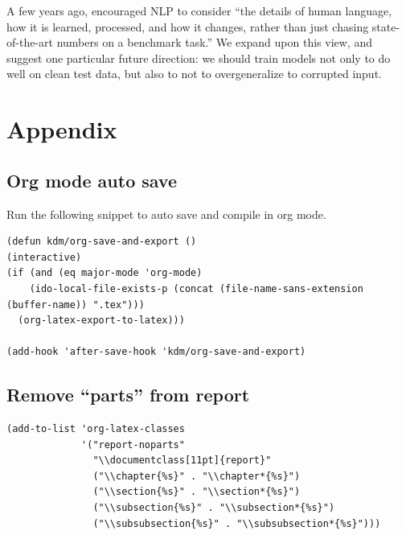 \documentclass[letterpaper, 12pt]{report}
\begin{document}
A few years ago, \cite{manning-etal-2015-computational} encouraged NLP to consider ``the details of human language, how it is learned, processed, and how it changes, rather than just chasing state-of-the-art numbers on a benchmark task.'' We expand upon this view, and suggest one particular future direction: we should train models not only to do well on clean test data, but also to not to overgeneralize to corrupted input. %



\clearpage





\printglossaries

\chapter{Appendix}
\label{sec:orgd5099eb}
\section{Org mode auto save}
\label{sec:orgde5798f}
Run the following snippet to auto save and compile in org mode.

\begin{verbatim}
(defun kdm/org-save-and-export ()
(interactive)
(if (and (eq major-mode 'org-mode)
    (ido-local-file-exists-p (concat (file-name-sans-extension (buffer-name)) ".tex")))
  (org-latex-export-to-latex)))

(add-hook 'after-save-hook 'kdm/org-save-and-export)
\end{verbatim}

\section{Remove ``parts'' from report}
\label{sec:orgacef247}

\begin{verbatim}
(add-to-list 'org-latex-classes
             '("report-noparts"
               "\\documentclass[11pt]{report}"
               ("\\chapter{%s}" . "\\chapter*{%s}")
               ("\\section{%s}" . "\\section*{%s}")
               ("\\subsection{%s}" . "\\subsection*{%s}")
               ("\\subsubsection{%s}" . "\\subsubsection*{%s}")))
\end{verbatim}
\end{document}
